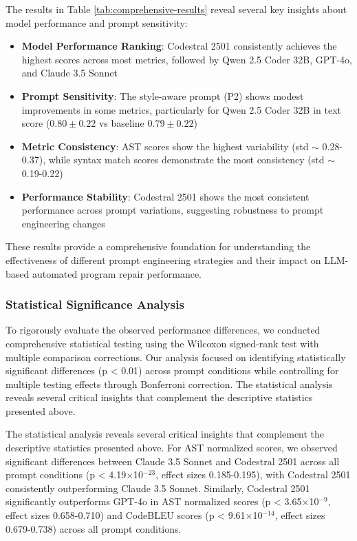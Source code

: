 The results in Table \ref{tab:comprehensive-results} reveal several key insights about model performance and prompt sensitivity:

\begin{itemize}
    \item \textbf{Model Performance Ranking}: Codestral 2501 consistently achieves the highest scores across most metrics, followed by Qwen 2.5 Coder 32B, GPT-4o, and Claude 3.5 Sonnet
    \item \textbf{Prompt Sensitivity}: The style-aware prompt (P2) shows modest improvements in some metrics, particularly for Qwen 2.5 Coder 32B in text score ($0.80 \pm 0.22$ vs baseline $0.79 \pm 0.22$)
    \item \textbf{Metric Consistency}: AST scores show the highest variability (std $\sim$ 0.28-0.37), while syntax match scores demonstrate the most consistency (std $\sim$ 0.19-0.22)
    \item \textbf{Performance Stability}: Codestral 2501 shows the most consistent performance across prompt variations, suggesting robustness to prompt engineering changes
\end{itemize}

These results provide a comprehensive foundation for understanding the effectiveness of different prompt engineering strategies and their impact on LLM-based automated program repair performance.

\subsubsection{Statistical Significance Analysis}
To rigorously evaluate the observed performance differences, we conducted comprehensive statistical testing using the Wilcoxon signed-rank test with multiple comparison corrections. Our analysis focused on identifying statistically significant differences (p < 0.01) across prompt conditions while controlling for multiple testing effects through Bonferroni correction. The statistical analysis reveals several critical insights that complement the descriptive statistics presented above.

The statistical analysis reveals several critical insights that complement the descriptive statistics presented above. For AST normalized scores, we observed significant differences between Claude 3.5 Sonnet and Codestral 2501 across all prompt conditions (p < 4.19$\times$10$^{-23}$, effect sizes 0.185-0.195), with Codestral 2501 consistently outperforming Claude 3.5 Sonnet. Similarly, Codestral 2501 significantly outperforms GPT-4o in AST normalized scores (p < 3.65$\times$10$^{-9}$, effect sizes 0.658-0.710) and CodeBLEU scores (p < 9.61$\times$10$^{-14}$, effect sizes 0.679-0.738) across all prompt conditions.


